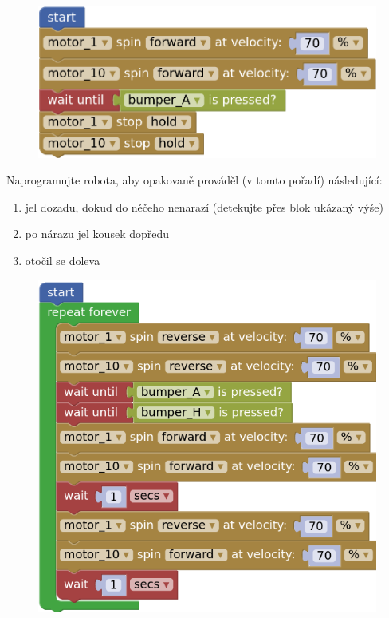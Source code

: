 \documentclass[../main.tex]{subfiles}
\begin{document}
	\begin{figure}
		\centering
		\begin{minipage}{0.5\textwidth}
			\includegraphics[width=\linewidth]{Images/02/sol7.png}
		\end{minipage}
	\end{figure}

	\begin{question}
		Naprogramujte robota, aby opakovaně prováděl (v tomto pořadí) následující:
		\begin{enumerate}
			\item jel dozadu, dokud do něčeho nenarazí (detekujte přes blok ukázaný výše)
			\item po nárazu jel kousek dopředu
			\item otočil se doleva
		\end{enumerate}
	\end{question}

	\begin{solution}
		\begin{figure}
			\centering
			\begin{minipage}{0.5\textwidth}
				\includegraphics[width=\linewidth]{Images/03/sol.png}
			\end{minipage}
		\end{figure}
	\end{solution}
\end{document}
